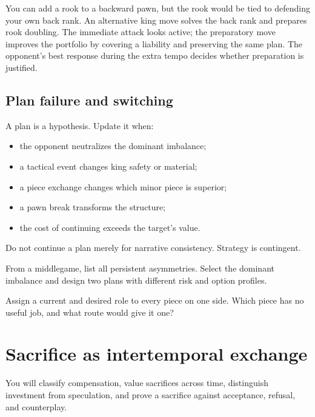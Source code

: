 \begin{workedbox}[title={Worked example: attack the base or improve the attacker?}]
You can add a rook to a backward pawn, but the rook would be tied to defending your own back rank. An alternative king move solves the back rank and prepares rook doubling. The immediate attack looks active; the preparatory move improves the portfolio by covering a liability and preserving the same plan. The opponent's best response during the extra tempo decides whether preparation is justified.
\end{workedbox}

\section{Plan failure and switching}
A plan is a hypothesis. Update it when:

\begin{itemize}[leftmargin=1.4em]
\item the opponent neutralizes the dominant imbalance;
\item a tactical event changes king safety or material;
\item a piece exchange changes which minor piece is superior;
\item a pawn break transforms the structure;
\item the cost of continuing exceeds the target's value.
\end{itemize}

Do not continue a plan merely for narrative consistency. Strategy is contingent.

\begin{exercise}
From a middlegame, list all persistent asymmetries. Select the dominant imbalance and design two plans with different risk and option profiles.
\end{exercise}

\begin{exercise}
Assign a current and desired role to every piece on one side. Which piece has no useful job, and what route would give it one?
\end{exercise}


\chapter{Sacrifice as intertemporal exchange}
\begin{learningbox}
You will classify compensation, value sacrifices across time, distinguish investment from speculation, and prove a sacrifice against acceptance, refusal, and counterplay.
\end{learningbox}

